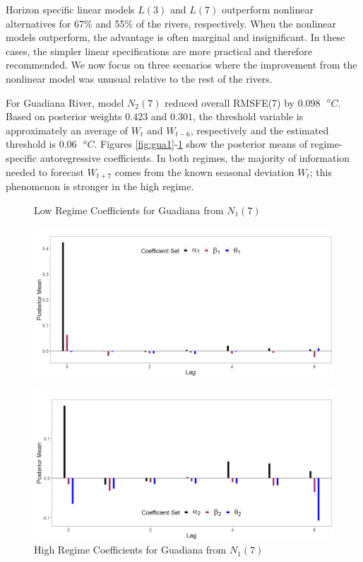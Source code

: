 Horizon specific linear models $L(3)$ and $L(7)$ outperform nonlinear alternatives for 67\% and 55\% of the rivers, respectively. 
When the nonlinear models outperform, the advantage is often marginal and insignificant. In these cases, the simpler linear specifications are more practical and therefore recommended. We now focus on three scenarios where the improvement from the nonlinear model was unusual relative to the rest of the rivers.

For Guadiana River, model $N_2(7)$ reduced overall RMSFE(7) by $0.098 \textrm{ }^o C$. Based on posterior weights $0.423$ and $0.301$, the threshold variable is approximately an average of $W_{t}$ and $W_{t-6}$, respectively and the estimated threshold is $0.06 \textrm{ }^o C$. Figures \ref{fig:gua1}-\ref{fig:gua2} show the posterior means of regime-specific autoregressive coefficients. In both regimes, the majority of information needed to forecast $W_{t+7}$ comes from the known seasonal deviation $W_t$; this phenomenon is stronger in the high regime.

\begin{figure}[!h]
\center
\begin{minipage}[h]{\textwidth}
\caption{Low Regime Coefficients for Guadiana from $N_1(7)$}
\label{fig:gua1}
\includegraphics[scale=0.3]{GuadianaL}
\end{minipage} \hspace{\textwidth}
\begin{minipage}[h]{\textwidth}
\caption{High Regime Coefficients for Guadiana from $N_1(7)$}
\label{fig:gua2}
\includegraphics[scale=0.3]{GuadianaH}
\end{minipage}
\end{figure}


